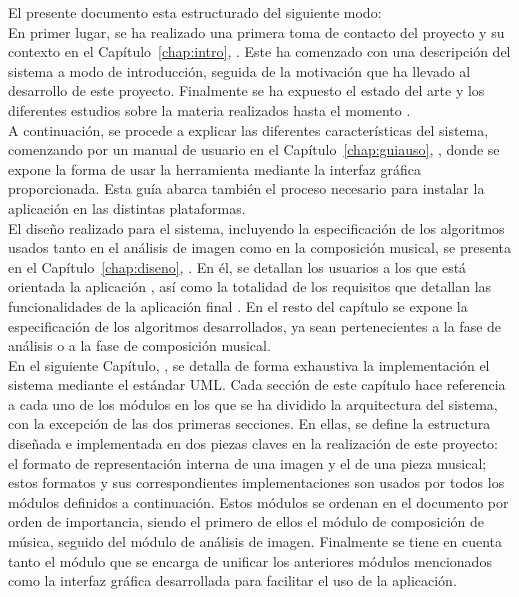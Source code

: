 El presente documento esta estructurado del siguiente modo:\\

En primer lugar, se ha realizado una primera toma de contacto del proyecto y su contexto en el Capítulo~\ref{chap:intro}, \textit{}. Este ha comenzado con una descripción del sistema a modo de introducción, seguida de la motivación que ha llevado al desarrollo de este proyecto. Finalmente se ha expuesto el estado del arte y los diferentes estudios sobre la materia realizados hasta el momento .\\

A continuación, se procede a explicar las diferentes características del sistema, comenzando por un manual de usuario en el Capítulo~\ref{chap:guiauso}, \textit{}, donde se expone la forma de usar la herramienta mediante la interfaz gráfica proporcionada. Esta guía abarca también el proceso necesario para instalar la aplicación en las distintas plataformas.\\

El diseño realizado para el sistema, incluyendo la especificación de los algoritmos usados tanto en el análisis de imagen como en la composición musical, se presenta en el Capítulo~\ref{chap:diseno}, \textit{}. En él, se detallan los usuarios a los que está orientada la aplicación , así como la totalidad de los requisitos que detallan las funcionalidades de la aplicación final
. En el resto del capítulo se expone la especificación de los algoritmos desarrollados, ya sean pertenecientes a la fase de análisis o a la fase de composición musical.\\

En el siguiente Capítulo, \textit{}, se detalla de forma exhaustiva la implementación el sistema mediante el estándar UML. Cada sección de este capítulo hace referencia a cada uno de los módulos en los que se ha dividido la arquitectura del sistema, con la excepción de las dos primeras secciones. En ellas, se define la estructura diseñada e implementada en dos piezas claves en la realización de este proyecto: el formato de representación interna de una imagen y el de una pieza musical; estos formatos y sus correspondientes implementaciones son usados por todos los módulos definidos a continuación. Estos módulos se ordenan en el documento por orden de importancia, siendo el primero de ellos el módulo de composición de música, seguido del módulo de análisis de imagen. Finalmente se tiene en cuenta tanto el módulo que se encarga de unificar los anteriores módulos mencionados como la interfaz gráfica desarrollada para facilitar el uso de la aplicación.\\

